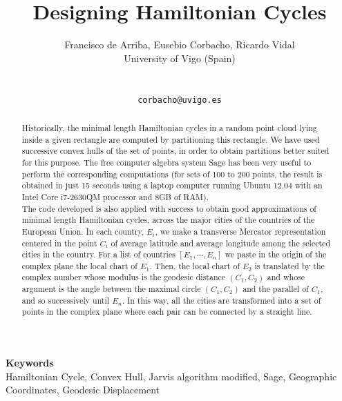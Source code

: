 \documentclass[a4paper]{article} %
\date{} %
\def\keywords#1{\begin{center}{\bf Keywords}\\{#1}\end{center}} %
\def\titulo#1{\title{#1}} %
\def\autores#1{\author{#1}} %
\begin{document}
\titulo{Designing Hamiltonian Cycles}

\autores{Francisco de Arriba, Eusebio Corbacho, Ricardo Vidal \\ %
       University of Vigo (Spain) %
       \\ %
        \\ \\ %
       \tt{corbacho@uvigo.es}\\
       }%


\maketitle

\thispagestyle{empty}




\begin{abstract}Historically, the minimal length Hamiltonian cycles in a random point cloud lying inside a given rectangle are computed by partitioning this rectangle. We have used successive convex hulls of the set of points, in order to obtain partitions better suited for this purpose. The free computer algebra system Sage has been very useful to perform the corresponding computations (for sets of 100 to 200 points, the result is obtained in just 15 seconds using a laptop computer running Ubuntu 12.04 with an Intel Core i7-2630QM processor and 8GB of RAM).\\

The code developed is also applied with success to obtain  good approximations of minimal length Hamiltonian cycles, across the major cities of the countries of the European Union. In each country, $E_i$, we make a transverse Mercator representation centered in the point $C_i$ of average latitude and average longitude among the selected cities in the country. For a list of countries $[E_1,\cdots,E_n]$ we paste in the origin of the complex plane the local chart of $E_1$. Then, the local chart of $E_2$ is translated by the complex number whose modulus is the geodesic distance $(C_1,C_2)$ and whose argument is the angle between the maximal circle $(C_1,C_2)$ and the parallel of $C_1$, and so successively until $E_n$. In this way, all the cities are transformed into a set of points in the complex plane where each pair can be connected by a straight line.
\end{abstract}
\keywords{Hamiltonian Cycle, Convex Hull, Jarvis algorithm modified, Sage, Geographic Coordinates, Geodesic Displacement }
\newpage
\end{document}
